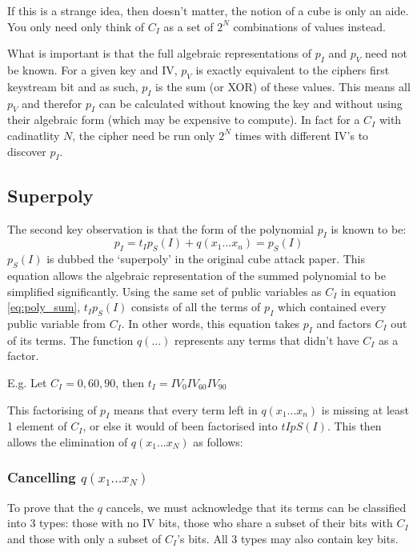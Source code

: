 \documentclass{report}
\let\Oldsubsection\subsection
\renewcommand{\subsection}{\FloatBarrier\Oldsubsection}
\let\Oldsubsubsection\subsubsection
\renewcommand{\subsubsection}{\FloatBarrier\Oldsubsubsection}
\begin{document}
If this is a strange idea, then doesn't matter, the notion of a cube is only an aide. You only need only think of $C_I$ as a set of $2^N$ combinations of values instead.

What is important is that the full algebraic representations of $p_I$ and $p_V$ need not be known. For a given key and IV, $p_V$ is exactly equivalent to the ciphers first keystream bit and as such, $p_I$ is the sum (or XOR) of these values. This means all $p_V$ and therefor $p_I$ can be calculated without knowing the key and without using their algebraic form (which may be expensive to compute). In fact for a $C_I$ with cadinatlity $N$, the cipher need be run only $2^N$ times with different IV's to discover $p_I$.

\subsection{Superpoly}
The second key observation is that the form of the polynomial $p_I$ is known to be:
\begin{equation} \label{eq:superpoly}
p_I = t_Ip_S(I)+q(x_1...x_n)=p_S(I)
\end{equation}
$p_S(I)$ is dubbed the `superpoly' in the original cube attack paper. This equation allows the algebraic representation of the summed polynomial to be simplified significantly. Using the same set of public variables as $C_I$ in equation \ref{eq:poly_sum}, $t_Ip_S(I)$ consists of all the terms of $p_I$ which contained every public variable from $C_I$. In other words, this equation takes $p_I$ and factors $C_I$ out of its terms. The function $q(...)$ represents any terms that didn't have $C_I$ as a factor.

E.g. Let $C_I={0, 60, 90}$, then  $t_I = IV_{0}IV_{60}IV_{90}$

This factorising of $p_I$ means that every term left in $q(x_1...x_n)$ is missing at least 1 element of $C_I$, or else it would of been factorised into $tIpS(I)$. This then allows the elimination of $q(x_1...x_N)$ as follows:

\subsubsection{Cancelling $q(x_1...x_N)$}
To prove that the $q$ cancels, we must acknowledge that its terms can be classified into 3 types: those with no IV bits, those who share a subset of their bits with $C_I$ and those with only a subset of $C_I$'s bits. All 3 types may also contain key bits.
\end{document}
